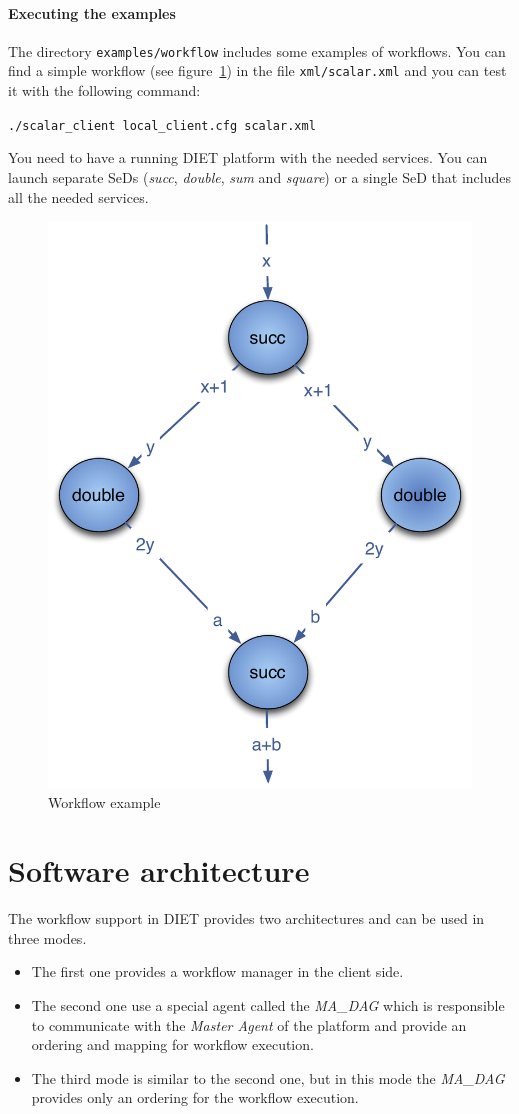 \paragraph{Executing the examples}

The directory \texttt{examples/workflow} includes some examples of
workflows.  You can find a simple workflow (see
figure~\ref{fig:example1}) in the file \texttt{xml/scalar.xml} and you
can test it with the following command:

\verb|./scalar_client local_client.cfg scalar.xml |

You need to have a running DIET platform with the needed services. You
can launch separate SeDs (\textit{succ}, \textit{double}, \textit{sum}
and \textit{square}) or a single SeD that includes all the needed
services.

\begin{figure}[htbp]
  \centering
  \includegraphics[keepaspectratio,width=0.4\linewidth]{fig/wf_example1}
  \caption{Workflow example}
  \label{fig:example1}
\end{figure}

\section{Software architecture}

The workflow support in \textsc{DIET} provides two architectures and
can be used in three modes.
\begin{itemize}
\item The first one provides a workflow manager in the client side.
\item The second one use a special agent called the \textit{MA\_DAG}
  which is responsible to communicate with the \textit{Master Agent} of
  the platform and provide an ordering and mapping for workflow
  execution.
\item The third mode is similar to the second one, but in this mode
  the \textit{MA\_DAG} provides only an ordering for the workflow
  execution.
\end{itemize}

